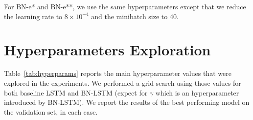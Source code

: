 \documentclass{article} %
\begin{document}
For BN-e* and BN-e**, we use the same hyperparameters except that we reduce the
learning rate to $8 \times 10^{-4}$ and the minibatch size to 40.


\section{Hyperparameters Exploration}

Table~\ref{tab:hyperparams} reports the main  hyperparameter values that were explored in the experiments. We performed a grid search using those values for both baseline LSTM and BN-LSTM (expect for $\gamma$ which is an hyperparameter introduced by BN-LSTM). We report the results of the best performing model on the validation set, in each case.

\begin{table}[!hb]


  \caption{Hyperparameter values that have been explored in the experiments.}
  \label{tab:hyperparams}

\end{table}
\end{document}
